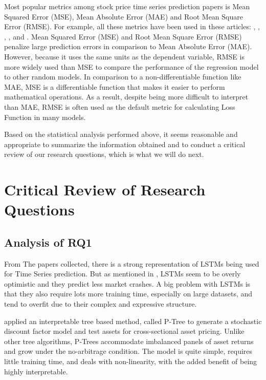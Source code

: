 \documentclass[11pt]{article}
\begin{document}
Most popular metrics among stock price time series prediction papers is Mean Squared Error (MSE), Mean Absolute Error (MAE) and Root Mean Square Error (RMSE). For example, all these metrics have been used in these articles: \cite{Dong2020}, \cite{Huan2020}, \cite{Guo2020}, \cite{Yu2019}, \cite{Yu2017} and \cite{Ray2021}.
Mean Squared Error (MSE) and Root Mean Square Error (RMSE) penalize large prediction errors in comparison to Mean Absolute Error (MAE). However, because it uses the same units as the dependent variable, RMSE is more widely used than MSE to compare the performance of the regression model to other random models. In comparison to a non-differentiable function like MAE, MSE is a differentiable function that makes it easier to perform mathematical operations. As a result, despite being more difficult to interpret than MAE, RMSE is often used as the default metric for calculating Loss Function in many models.

Based on the statistical analysis performed above, it seems reasonable and appropriate to summarize the information obtained and to conduct a critical review of our research questions, which is what we will do next.


\section{Critical Review of Research Questions}

\subsection{Analysis of RQ1}\label{S:analysisRQ1}
From The papers collected, there is a strong representation of LSTMs being used for Time Series prediction. But as mentioned in \cite{Feng2018}, LSTMs seem to be overly optimistic and they predict less market crashes. A big problem with LSTMs is that they also require lots more training time, especially on large datasets, and tend to overfit due to their complex and expressive structure.

\cite{Cong2022} applied an interpretable tree based method, called P-Tree to generate a stochastic discount factor model and test assets for cross-sectional asset pricing. Unlike other tree algorithms, P-Trees
accommodate imbalanced panels of asset returns and grow under the no-arbitrage condition. The model is quite simple, requires little training time, and deals with non-linearity, with the added benefit of being highly interpretable. 
\end{document}
